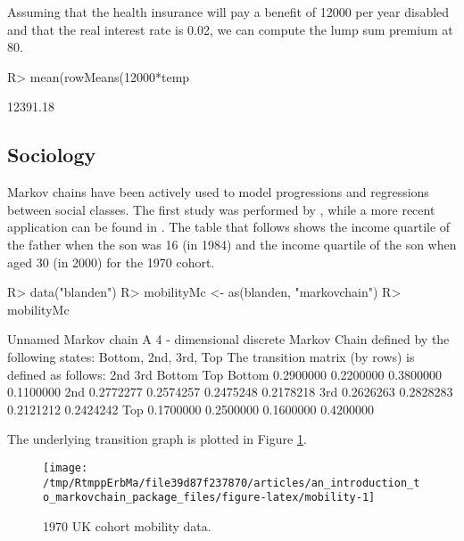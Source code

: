 \documentclass[
  nojss]{jss}
\begin{document}
Assuming that the health insurance will pay a benefit of 12000 per year disabled and that the real interest rate is 0.02, we can compute the lump sum premium at 80.

\begin{CodeChunk}

\begin{CodeInput}
R> mean(rowMeans(12000*temp%
\end{CodeInput}

\begin{CodeOutput}
[1] 12391.18
\end{CodeOutput}
\end{CodeChunk}

\hypertarget{app:sociology}{%
\subsection{Sociology}\label{app:sociology}}

Markov chains have been actively used to model progressions and regressions between social classes. The first study was performed by \cite{glassHall}, while a more recent application can be found in \cite{blandenEtAlii}. The table that follows shows the income quartile of the father when the son was 16 (in 1984) and the income quartile of the son when aged 30 (in 2000) for the 1970 cohort.

\begin{CodeChunk}

\begin{CodeInput}
R> data("blanden")
R> mobilityMc <- as(blanden, "markovchain")
R> mobilityMc
\end{CodeInput}

\begin{CodeOutput}
Unnamed Markov chain 
 A  4 - dimensional discrete Markov Chain defined by the following states: 
 Bottom, 2nd, 3rd, Top 
 The transition matrix  (by rows)  is defined as follows: 
             2nd       3rd    Bottom       Top
Bottom 0.2900000 0.2200000 0.3800000 0.1100000
2nd    0.2772277 0.2574257 0.2475248 0.2178218
3rd    0.2626263 0.2828283 0.2121212 0.2424242
Top    0.1700000 0.2500000 0.1600000 0.4200000
\end{CodeOutput}
\end{CodeChunk}

The underlying transition graph is plotted in Figure \ref{fig:mobility}.

\begin{CodeChunk}
\begin{figure}

{\centering \texttt{[image: /tmp/RtmppErbMa/file39d87f237870/articles/an\_introduction\_to\_markovchain\_package\_files/figure-latex/mobility-1]} 

}

\caption[1970 UK cohort mobility data]{1970 UK cohort mobility data.}\label{fig:mobility}
\end{figure}
\end{CodeChunk}
\end{document}
